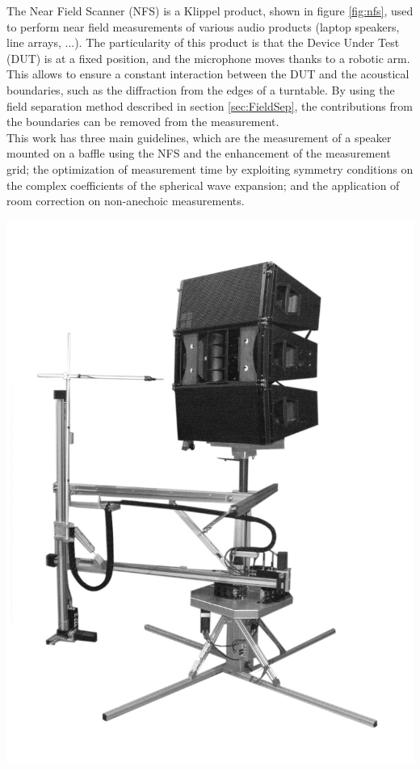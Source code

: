 \documentclass{report}
\begin{document}
\begin{minipage}{0.6\textwidth}
The Near Field Scanner (NFS) is a Klippel product, shown in figure \ref{fig:nfs}, used to perform near field measurements of various audio products (laptop speakers, line arrays, ...). The particularity of this product is that the Device Under Test (DUT) is at a fixed position, and the microphone moves thanks to a robotic arm. This allows to ensure a constant interaction between the DUT and the acoustical boundaries, such as the diffraction from the edges of a turntable. By using the field separation method described in section \ref{sec:FieldSep}, the contributions from the boundaries can be removed from the measurement. \\

This work has three main guidelines, which are the measurement of a speaker mounted on a baffle using the NFS and the enhancement of the measurement grid; the optimization of measurement time by exploiting symmetry conditions on the complex coefficients of the spherical wave expansion; and the application of room correction on non-anechoic measurements.
\end{minipage}
\begin{minipage}{0.4\textwidth}
\begin{center}
	\includegraphics[scale=0.13]{Preface/NFS2} 
    \captionsetup{hypcap=false} 
	\label{fig:nfs}
\end{center}
\end{minipage}\newline
\end{document}
